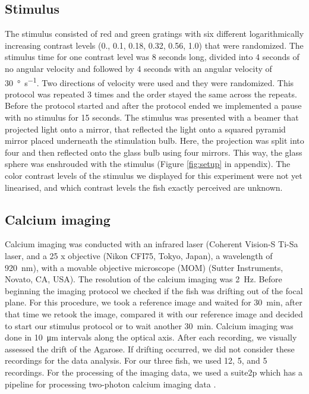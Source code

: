 \subsection{Stimulus}
The stimulus consisted of red and green gratings with six different logarithmically increasing contrast levels (0., 0.1, 0.18, 0.32, 0.56, 1.0) that were randomized. The stimulus time for one contrast level was 8 seconds long, divided into 4 seconds of no angular velocity and followed by 4 seconds with an angular velocity of \SI{30}{\degree\per\second}. Two directions of velocity were used and they were randomized. This protocol was repeated 3 times and the order stayed the same across the repeats. Before the protocol started and after the protocol ended we implemented a pause with no stimulus for 15 seconds. The stimulus was presented with a beamer that projected light onto a mirror, that reflected the light onto a squared pyramid mirror placed underneath the stimulation bulb. Here, the projection was split into four and then reflected onto the glass bulb using four mirrors. This way, the glass sphere was enshrouded with the stimulus (Figure \ref{fig:setup} in appendix). The color contrast levels of the stimulus we displayed for this experiment were not yet linearised, and which contrast levels the fish exactly perceived are unknown. 

\subsection{Calcium imaging}
Calcium imaging was conducted with an infrared laser (Coherent Vision-S Ti-Sa laser, and a 25 x objective (Nikon CFI75, Tokyo, Japan),  a wavelength of \SI{920}{\nano\meter}), with a movable objective microscope (MOM) (Sutter Instruments, Novato, CA, USA). The resolution of the calcium imaging was \SI{2}{\hertz}. Before beginning the imaging protocol we checked if the fish was drifting out of the focal plane. For this procedure, we took a reference image and waited for \SI{30}{\minute}, after that time we retook the image, compared it with our reference image and decided to start our stimulus protocol or to wait another \SI{30}{\minute}. Calcium imaging was done in \SI{10}{\micro\meter} intervals along the optical axis. After each recording, we visually assessed the drift of the Agarose. If drifting occurred, we did not consider these recordings for the data analysis. For our three fish, we used 12, 5, and 5 recordings. For the processing of the imaging data, we used a suite2p which has a pipeline for processing two-photon calcium imaging data \parencite{Pachitariu061507}.

